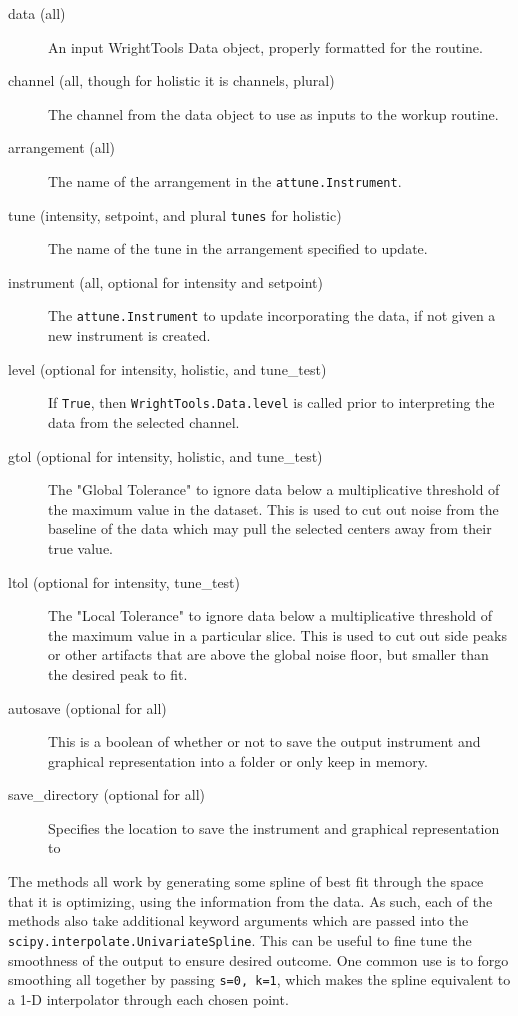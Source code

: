 \begin{description}
\item[data (all)]
An input WrightTools Data object, properly formatted for the routine.
\item[channel (all, though for holistic it is channels, plural)]
The channel from the data object to use as inputs to the workup routine.
\item[arrangement (all)]
The name of the arrangement in the
\texttt{attune.Instrument}.
\item[tune (intensity, setpoint, and plural \texttt{tunes} for
holistic)]
The name of the tune in the arrangement specified to update.
\item[instrument (all, optional for intensity and setpoint)]
The \texttt{attune.Instrument} to update incorporating
the data, if not given a new instrument is created.
\item[level (optional for intensity, holistic, and tune\_test)]
If \texttt{True}, then \texttt{WrightTools.Data.level} is called
prior to interpreting the data from the selected channel.
\item[gtol (optional for intensity, holistic, and tune\_test)]
The "Global Tolerance" to ignore data below a multiplicative threshold
of the maximum value in the dataset. This is used to cut out noise from
the baseline of the data which may pull the selected centers away from
their true value.
\item[ltol (optional for intensity, tune\_test)]
The "Local Tolerance" to ignore data below a multiplicative threshold of
the maximum value in a particular slice. This is used to cut out side
peaks or other artifacts that are above the global noise floor, but
smaller than the desired peak to fit.
\item[autosave (optional for all)]
This is a boolean of whether or not to save the output instrument and
graphical representation into a folder or only keep in memory.
\item[save\_directory (optional for all)]
Specifies the location to save the instrument and graphical
representation to
\end{description}

The methods all work by generating some spline of best fit through the
space that it is optimizing, using the information from the data. As
such, each of the methods also take additional keyword arguments which
are passed into the \texttt{scipy.interpolate.UnivariateSpline}. This
can be useful to fine tune the smoothness of the output to ensure
desired outcome. One common use is to forgo smoothing all together by
passing \texttt{s=0,\ k=1}, which makes the spline equivalent to a 1-D
interpolator through each chosen point.

